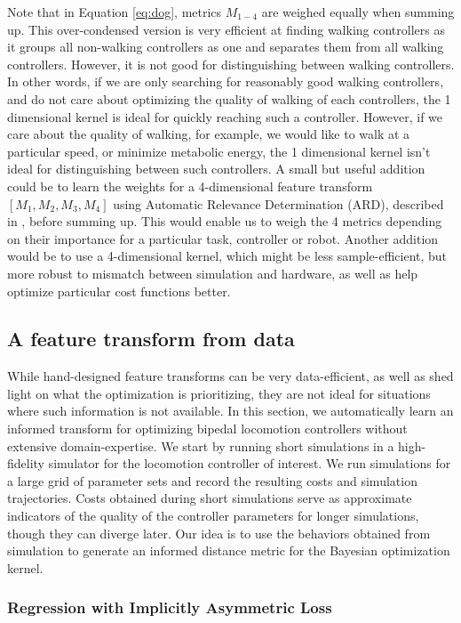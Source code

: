 Note that in Equation \ref{eq:dog}, metrics $M_{1-4}$ are weighed equally when summing up. This over-condensed version is very efficient at finding walking controllers as it groups all non-walking controllers as one and separates them from all walking controllers. However, it is not good for distinguishing between walking controllers. In other words, if we are only searching for reasonably good walking controllers, and do not care about optimizing the quality of walking of each controllers, the 1 dimensional kernel is ideal for quickly reaching such a controller. However, if we care about the quality of walking, for example, we would like to walk at a particular speed, or minimize metabolic energy, the 1 dimensional kernel isn't ideal for distinguishing between such controllers.
A small but useful addition could be to learn the weights for a 4-dimensional feature transform $[M_1, M_2, M_3, M_4]$ using Automatic Relevance Determination (ARD), described in \cite{GPsMLBook}, before summing up. This would enable us to weigh the 4 metrics depending on their importance for a particular task, controller or robot. Another addition would be to use a 4-dimensional kernel, which might be less sample-efficient, but more robust to mismatch between simulation and hardware, as well as help optimize particular cost functions better. 


\subsection{A feature transform from data}

While hand-designed feature transforms can be very data-efficient, as well as shed light on what the optimization is prioritizing, they are not ideal for situations where such information is not available. In this section, we automatically learn an informed transform for optimizing bipedal locomotion controllers without extensive domain-expertise. We start by running short simulations in a high-fidelity simulator for the locomotion controller of interest. 
We run simulations for a large grid of parameter sets and record the resulting costs and simulation trajectories. Costs obtained during short simulations serve as approximate indicators of the quality of the controller parameters for longer simulations, though they can diverge later. Our idea is to use the behaviors obtained from simulation to generate an informed distance metric for the Bayesian optimization kernel. 

\subsubsection{Regression with Implicitly Asymmetric Loss}
\label{sec:approach_asym}

